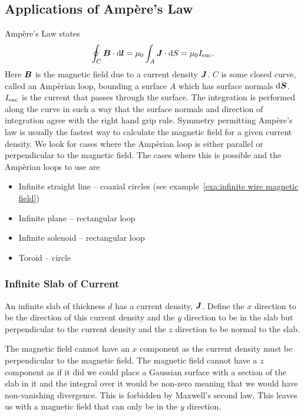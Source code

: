     \subsection{Applications of Amp\`ere's Law}
    Amp\`ere's Law states
    \[\oint_C \bm{B}\cdot\dd{\bm{l}} = \mu_0 \int_A\bm{J}\cdot\dd{S} = \mu_0 I_{\mathrm{enc}}.\]
    Here \(\bm{B}\) is the magnetic field due to a current density \(\bm{J}\).
    \(C\) is some closed curve, called an Amp\`erian loop, bounding a surface \(A\) which has surface normals \(\dd{\bm{S}}\).
    \(I_{\mathrm{enc}}\) is the current that passes through the surface.
    The integration is performed along the curve in such a way that the surface normals and direction of integration agree with the right hand grip rule.
    Symmetry permitting Amp\`ere's law is usually the fastest way to calculate the magnetic field for a given current density.
    We look for cases where the Amp\`erian loop is either parallel or perpendicular to the magnetic field.
    The cases where this is possible and the Amp\`erian loops to use are
    \begin{itemize}
        \item Infinite straight line -- coaxial circles (see example~\ref{exa:infinite wire magnetic field})
        \item Infinite plane -- rectangular loop
        \item Infinite solenoid -- rectangular loop
        \item Toroid -- circle
    \end{itemize}
    \subsubsection{Infinite Slab of Current}
    An infinite slab of thickness \(d\) has a current density, \(\bm{J}\).
    Define the \(x\) direction to be the direction of this current density and the \(y\) direction to be in the slab but perpendicular to the current density and the \(z\) direction to be normal to the slab.
    
    The magnetic field cannot have an \(x\) component as the current density must be perpendicular to the magnetic field.
    The magnetic field cannot have a \(z\) component as if it did we could place a Gaussian surface with a section of the slab in it and the integral over it would be non-zero meaning that we would have non-vanishing divergence.
    This is forbidden by Maxwell's second law.
    This leaves us with a magnetic field that can only be in the \(y\) direction.
    
